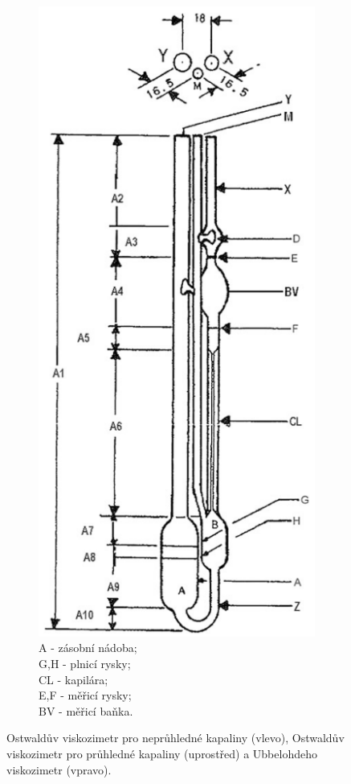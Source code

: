 \documentclass[12pt]{article}
\begin{document}
\begin{figure}
\begin{subfigure}[b]{.3\textwidth}
        \includegraphics[height=0.4\paperheight]{figures/ubbelohde.png}
        \caption{A - zásobní nádoba;\\G,H - plnicí rysky;\\CL - kapilára;\\E,F - měřicí rysky;\\BV - měřicí baňka.}
        \label{sfig:Ubbelohde}
    \end{subfigure}
    \caption{Ostwaldův viskozimetr pro neprůhledné kapaliny (vlevo), Ostwaldův viskozimetr pro průhledné kapaliny (uprostřed) a Ubbelohdeho viskozimetr (vpravo).~\cite{book:Calibration_of_viscometers}}
    \label{fig:viskozimetry}
\end{figure} %
\end{document}
